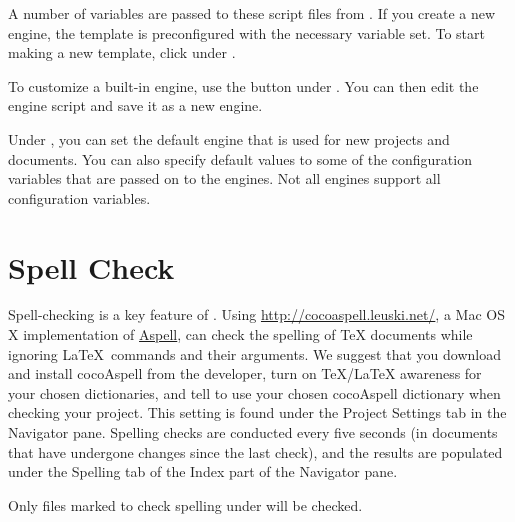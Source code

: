A number of variables are passed to these script files from \texnicle. If you create a new engine, the template is preconfigured with the necessary variable set. To start making a new template, click  under .


To customize a built-in engine, use the  button under . You can then edit the engine script and save it as a new engine.

Under , you can set the default engine that is used for new projects and documents. You can also specify default values to some of the configuration variables that are passed on to the engines. Not all engines support all configuration variables.

\section{Spell Check}
\label{reference.spellcheck}
Spell-checking is a key feature of \texnicle. Using \href{http://cocoaspell.leuki.com}{http://cocoaspell.leuski.net/}, a Mac OS X implementation of \href{http://aspell.net/}{Aspell}, \texnicle can check the spelling of {\TeX} documents while ignoring \LaTeX\ commands and their arguments. We suggest that you download and install cocoAspell from the developer, turn on {\TeX/\LaTeX} awareness for your chosen dictionaries, and tell \texnicle to use your chosen cocoAspell dictionary when checking your project. This setting is found under the Project Settings tab in the Navigator pane. Spelling checks are conducted every five seconds (in documents that have undergone changes since the last check), and the results are populated under the Spelling tab of the Index part of the Navigator pane.

Only files marked to check spelling under  will be checked.

